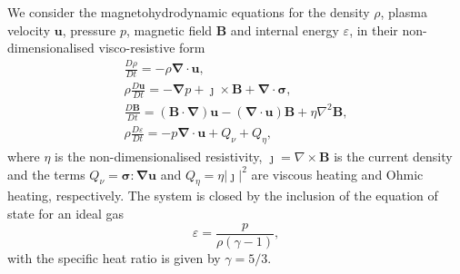 \documentclass[fleqn,usenatbib]{mnras}
\newcommand{\ten}[1]{{\bm #1}}
\renewcommand{\vec}[1]{{\bm #1}}
\begin{document}
We consider the magnetohydrodynamic equations for the density $\rho$, plasma
velocity $\vec{u}$, pressure $p$, magnetic field $\vec{B}$ and internal energy
$\varepsilon$, in their non-dimensionalised visco-resistive form
\begin{subequations}
  \label{eq:MHD}
  \begin{gather}
\label{eq:mhda}
\frac{D\rho}{Dt} = - \rho \vec{\nabla} \cdot \vec{u},\\
\rho\frac{D\vec{u}}{Dt} = -\vec{\nabla} p + \vec{\jmath} \times \vec{B} + \vec{\nabla} \cdot \ten{\sigma},\\
\frac{D\vec{B}}{Dt} = (\vec{B} \cdot \vec{\nabla})\vec{u} - (\vec{\nabla} \cdot \vec{u})\vec{B} + \eta \nabla^2 \vec{B},\\
\rho\frac{D\varepsilon}{Dt} = -p \vec{\nabla} \cdot \vec{u} + {Q}_{\nu} + {Q}_{\eta},%
    \end{gather}
\end{subequations}
where $\eta$ is the non-dimensionalised resistivity, $\vec{\jmath} = \nabla
\times \vec{B}$ is the current density and the terms ${Q}_{\nu} = \ten{\sigma}
: \vec{\nabla}\vec{u}$ and ${Q}_{\eta} = \eta | \vec{\jmath} |^2$ are viscous
heating and Ohmic heating, respectively. The system is closed by the inclusion
of the equation of state for an ideal gas 
\begin{equation}
\varepsilon = \frac{p}{\rho(\gamma - 1)},
\end{equation}
with the specific heat ratio is given by $\gamma = 5/3$.
\end{document}
